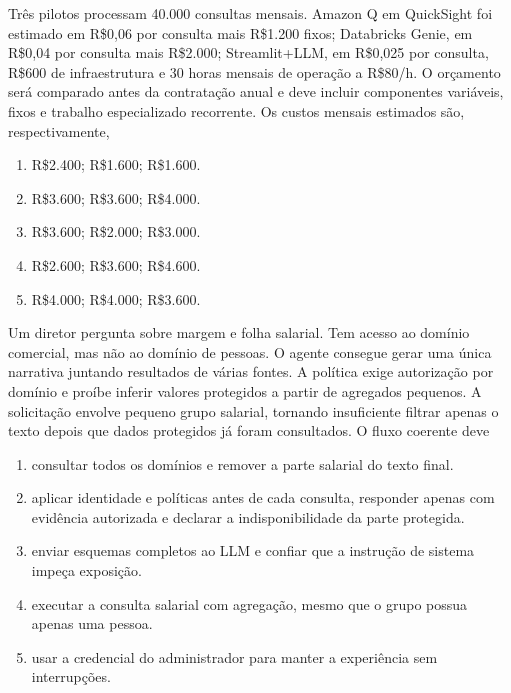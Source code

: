 \TextoBase
Três pilotos processam 40.000 consultas mensais. Amazon Q em QuickSight foi estimado em R\$0,06 por consulta mais R\$1.200 fixos; Databricks Genie, em R\$0,04 por consulta mais R\$2.000; Streamlit+LLM, em R\$0,025 por consulta, R\$600 de infraestrutura e 30 horas mensais de operação a R\$80/h.
O orçamento será comparado antes da contratação anual e deve incluir componentes variáveis, fixos e trabalho especializado recorrente.
\FonteDidatica
\Comando Os custos mensais estimados são, respectivamente,
\begin{enumerate}[label=\Alph*)]
\item R\$2.400; R\$1.600; R\$1.600.
\item R\$3.600; R\$3.600; R\$4.000.
\item R\$3.600; R\$2.000; R\$3.000.
\item R\$2.600; R\$3.600; R\$4.600.
\item R\$4.000; R\$4.000; R\$3.600.
\end{enumerate}

\TextoBase
Um diretor pergunta sobre margem e folha salarial. Tem acesso ao domínio comercial, mas não ao domínio de pessoas. O agente consegue gerar uma única narrativa juntando resultados de várias fontes. A política exige autorização por domínio e proíbe inferir valores protegidos a partir de agregados pequenos.
A solicitação envolve pequeno grupo salarial, tornando insuficiente filtrar apenas o texto depois que dados protegidos já foram consultados.
\FonteDidatica
\Comando O fluxo coerente deve
\begin{enumerate}[label=\Alph*)]
\item consultar todos os domínios e remover a parte salarial do texto final.
\item aplicar identidade e políticas antes de cada consulta, responder apenas com evidência autorizada e declarar a indisponibilidade da parte protegida.
\item enviar esquemas completos ao LLM e confiar que a instrução de sistema impeça exposição.
\item executar a consulta salarial com agregação, mesmo que o grupo possua apenas uma pessoa.
\item usar a credencial do administrador para manter a experiência sem interrupções.
\end{enumerate}

